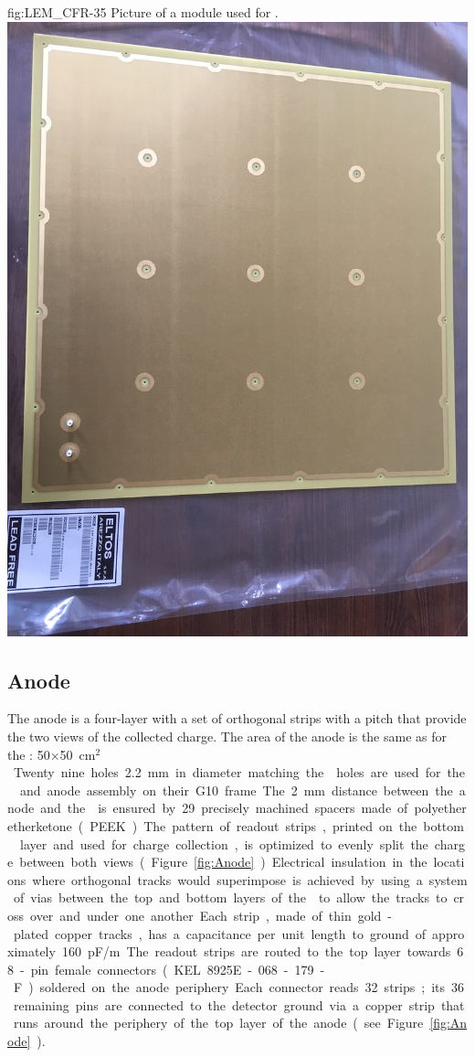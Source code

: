 \begin{dunefigure}
{fig:LEM_CFR-35}
{Picture of a  module used for  .}
\includegraphics[width=.75\textwidth]{graphics/LEM_CFR-35}
\end{dunefigure}

\subsection{Anode}
\label{sec:fddp-crp-anode}
 
The anode is a four-layer  with a set of orthogonal strips with a \dpstrippitch pitch that provide the two views of the collected charge. The area of the anode is the same as for the :  \num{50}$\times$\SI{50}{cm$^2$}. Twenty nine holes \SI{2.2}{mm} in diameter matching the  holes are used for the  and anode assembly on their G10 frame. The \SI{2}{mm} distance between the anode and the  is ensured by \num{29} precisely machined spacers made of polyetheretherketone (PEEK). 

The pattern of readout strips, printed on the bottom  layer and used for charge collection, is optimized to evenly split the charge between both views (Figure~\ref{fig:Anode}). Electrical insulation in the locations where orthogonal tracks would superimpose is achieved by 
using a system of vias between the top and bottom layers of the  to allow the tracks to cross over and under one another. 
Each strip, made of thin gold-plated copper tracks, has a capacitance per unit length to ground of approximately 
\SI{160}{pF/m}. The readout strips are routed to the top layer towards \num{68}-pin female connectors (KEL 8925E-068-179-F) soldered on the anode periphery. Each connector reads \num{32} strips; its \num{36} remaining pins are connected to the detector ground via a copper strip that runs around the periphery of the top layer of the anode (see Figure \ref{fig:Anode}). 

